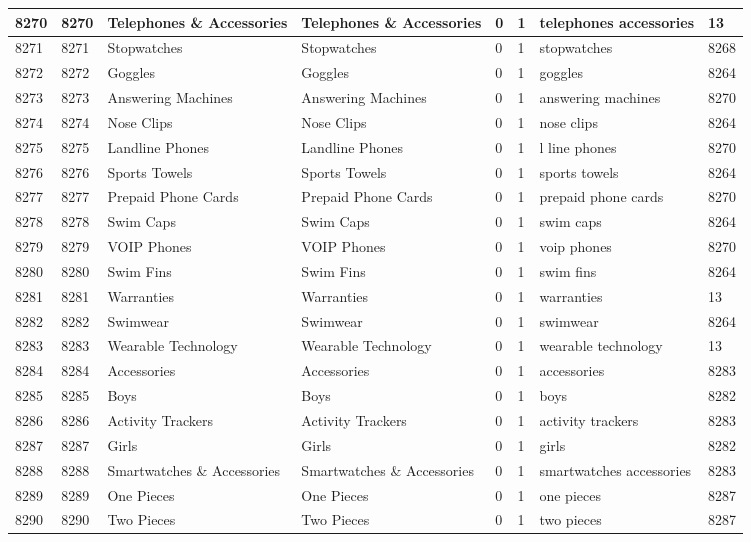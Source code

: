 \begin{longtable}{|l|l|l|l|l|l|l|l|}
8270 & 8270 & Telephones \& Accessories & Telephones \& Accessories & 0 & 1 & telephones accessories & 13 \\ \hline 
8271 & 8271 & Stopwatches & Stopwatches & 0 & 1 & stopwatches & 8268 \\ \hline 
8272 & 8272 & Goggles & Goggles & 0 & 1 & goggles & 8264 \\ \hline 
8273 & 8273 & Answering Machines & Answering Machines & 0 & 1 & answering machines & 8270 \\ \hline 
8274 & 8274 & Nose Clips & Nose Clips & 0 & 1 & nose clips & 8264 \\ \hline 
8275 & 8275 & Landline Phones & Landline Phones & 0 & 1 & l line phones & 8270 \\ \hline 
8276 & 8276 & Sports Towels & Sports Towels & 0 & 1 & sports towels & 8264 \\ \hline 
8277 & 8277 & Prepaid Phone Cards & Prepaid Phone Cards & 0 & 1 & prepaid phone cards & 8270 \\ \hline 
8278 & 8278 & Swim Caps & Swim Caps & 0 & 1 & swim caps & 8264 \\ \hline 
8279 & 8279 & VOIP Phones & VOIP Phones & 0 & 1 & voip phones & 8270 \\ \hline 
8280 & 8280 & Swim Fins & Swim Fins & 0 & 1 & swim fins & 8264 \\ \hline 
8281 & 8281 & Warranties & Warranties & 0 & 1 & warranties & 13 \\ \hline 
8282 & 8282 & Swimwear & Swimwear & 0 & 1 & swimwear & 8264 \\ \hline 
8283 & 8283 & Wearable Technology & Wearable Technology & 0 & 1 & wearable technology & 13 \\ \hline 
8284 & 8284 & Accessories & Accessories & 0 & 1 & accessories & 8283 \\ \hline 
8285 & 8285 & Boys & Boys & 0 & 1 & boys & 8282 \\ \hline 
8286 & 8286 & Activity Trackers & Activity Trackers & 0 & 1 & activity trackers & 8283 \\ \hline 
8287 & 8287 & Girls & Girls & 0 & 1 & girls & 8282 \\ \hline 
8288 & 8288 & Smartwatches \& Accessories & Smartwatches \& Accessories & 0 & 1 & smartwatches accessories & 8283 \\ \hline 
8289 & 8289 & One Pieces & One Pieces & 0 & 1 & one pieces & 8287 \\ \hline 
8290 & 8290 & Two Pieces & Two Pieces & 0 & 1 & two pieces & 8287 \\ \hline 

\end{longtable}
